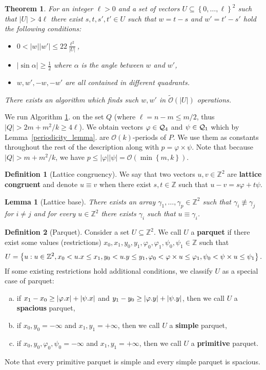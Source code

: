 \documentclass[11pt]{article}
\newcommand{\Z}{\mathbb{Z}}
\renewcommand{\O}{\mathcal{O}}
\newcommand{\tO}{\tilde{\mathcal{O}}}
\renewcommand{\phi}{\varphi}
\newcommand{\set}[1]{\left\lbrace #1 \right\rbrace}
\theoremstyle{plain}
\newtheorem{theorem}{Theorem}
\newtheorem{lemma}{Lemma}
\theoremstyle{definition}
\newtheorem{definition}{Definition}
\theoremstyle{remark}
\begin{document}
\begin{theorem}
	\label{get_periods}
	For an integer $\ell > 0$ and a set of vectors $U \subseteq \set{0, \dots, \ell}^2 $ such that $|U| > 4\ell$ there exist $s, t, s', t' \in U$ such that $w = t - s$ and $w' = t' - s'$ hold the following conditions:
	\begin{itemize}
		\item $0 < |w||w'| \le 22\frac{\ell^2}{|U|}$,
		\item $|\sin \alpha| \ge \frac{1}{2}$ where $\alpha$ is the angle between $w$ and $w'$,
		\item $w, w', -w, -w'$ are all contained in different quadrants.
	\end{itemize}
	There exists an algorithm which finds such $w, w'$ in $\tO(|U|)$ operations.
\end{theorem}


We run Algorithm \ref{get_periods}. on the set $Q$ (where $\ell = n - m \le m / 2$, thus $|Q| > 2m + m^2/k \ge 4\ell$).
We obtain vectors $\phi \in \Q_4$ and $\psi \in \mathcal{Q}_1$ which by Lemma~\ref{periodicity_lemma}. are $\O(k)$-periods of $P$.
We use them as constants throughout the rest of the description along with $p = \phi \times \psi$.
Note that because $|Q| > m + m^2 / k$, we have $p \le |\phi||\psi| = \O(\min\set{m, k})$.


\begin{definition}[Lattice congruency]
	We say that two vectors $u, v \in \Z^2$ are \textbf{lattice congruent} and denote $u \equiv v$ when there exist $s, t \in \Z$ such that $u - v = s\phi + t\psi$.
\end{definition}


\begin{lemma}[Lattice base]\label{lattice_base}
	There exists an array $\gamma_1, \dots, \gamma_p \in \Z^2$ such that $\gamma_i \not \equiv \gamma_j$ for $i \neq j$ and for every $u \in \Z^2$ there exists $\gamma_i$ such that $u \equiv \gamma_i$.
\end{lemma}


\begin{definition}[Parquet]
	Consider a set $U \subseteq \Z^2$. We call $U$ a \textbf{parquet} if there exist some values (restrictions) $x_0, x_1, y_0, y_1, \phi_0, \phi_1, \psi_0, \psi_1 \in \Z$ such that
	$$ U = \set{u : u \in \Z^2, x_0 < \x{u} \le x_1, y_0 < \y{u} \le y_1, \phi_0 < \h{u} \le \phi_1, \psi_0 < \s{u} \le \psi_1}. $$
	If some existing restrictions hold additional conditions, we classify $U$ as a special case of parquet:
	\begin{enumerate}[a)]
		\item if $x_1 - x_0 \ge |\x{\phi}| + |\x{\psi}|$ and $y_1 - y_0 \ge |\y{\phi}| + |\y{\psi}|$, then we call $U$ a \textbf{spacious} parquet,
		\item if $x_0, y_0 = -\infty$ and $x_1, y_1 = +\infty$, then we call $U$ a \textbf{simple} parquet,
		\item if $x_0, y_0, \phi_0, \psi_0 = -\infty$ and $x_1, y_1 = +\infty$, then we call $U$ a \textbf{primitive} parquet.
	\end{enumerate}
	Note that every primitive parquet is simple and every simple parquet is spacious.
\end{definition}
\end{document}

